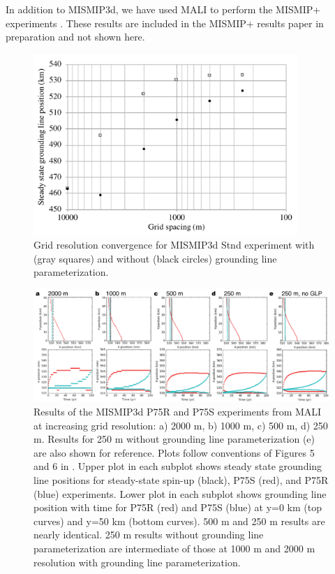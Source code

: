 In addition to MISMIP3d, we have used MALI to perform the MISMIP+ experiments \citep{Asay-Davis2016}.  
These results are included in the MISMIP+ results paper in preparation and not shown here.


\begin{figure}[t]
\includegraphics[width=10.0cm]{landice/figures/MISMIP3d_Stnd_convergence_plot.pdf}
\caption{
Grid resolution convergence for MISMIP3d Stnd experiment with (gray squares) and without (black circles) grounding line parameterization.
}
\label{mismip-convergence}
\end{figure}

\begin{figure}[t]
\includegraphics[width=16.0cm]{landice/figures/mismip3d.png}
\caption{
Results of the MISMIP3d P75R and P75S experiments from MALI at increasing grid resolution:
a) 2000 m, b) 1000 m, c) 500 m, d) 250 m.
Results for 250 m without grounding line parameterization (e) are also shown for reference.
Plots follow conventions of Figures 5 and 6 in \citet{pattyn2013}.
Upper plot in each subplot shows steady state grounding line positions for steady-state spin-up (black), P75S (red), and P75R (blue) experiments.
Lower plot in each subplot shows grounding line position with time for P75R (red) and P75S (blue) at y=0 km (top curves) and y=50 km (bottom curves).
500 m and 250 m results are nearly identical.  
250 m results without grounding line parameterization are intermediate of those at 1000 m and 2000 m resolution with grounding line parameterization.
}
\label{mismip-p75}
\end{figure}
